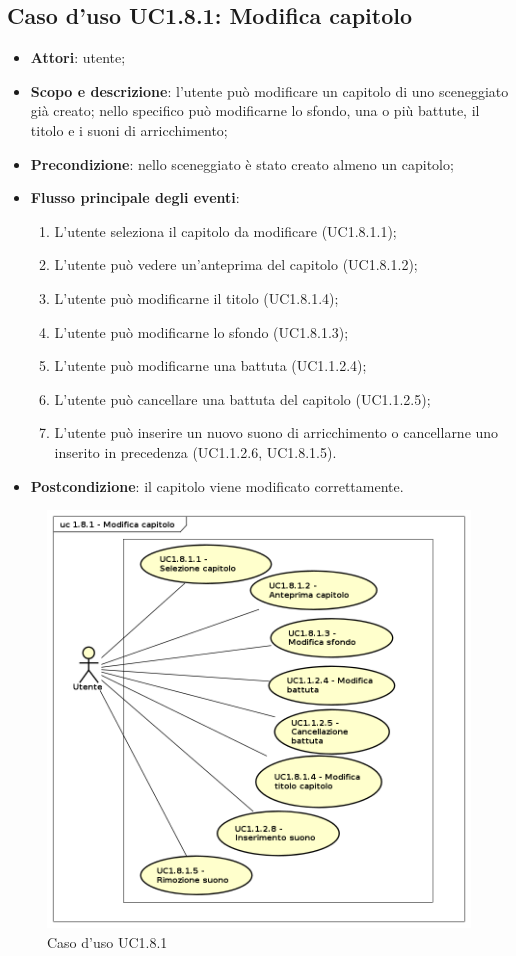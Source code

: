 \subsection{Caso d'uso UC1.8.1: Modifica capitolo}
\label{sec:UC1.8.1}

\begin{itemize}
\item \textbf{Attori}: utente;
\item \textbf{Scopo e descrizione}: l'utente può modificare un capitolo di uno sceneggiato già creato; nello specifico può modificarne lo sfondo, una o più battute, il titolo e i suoni di arricchimento;
\item \textbf{Precondizione}: nello sceneggiato è stato creato almeno un capitolo;
\item \textbf{Flusso principale degli eventi}:
\begin{enumerate}
\item L'utente seleziona il capitolo da modificare (UC1.8.1.1);
\item L'utente può vedere un'anteprima del capitolo (UC1.8.1.2);
\item L'utente può modificarne il titolo (UC1.8.1.4);
\item L'utente può modificarne lo sfondo (UC1.8.1.3);
\item L'utente può modificarne una battuta (UC1.1.2.4);
\item L'utente può cancellare una battuta del capitolo (UC1.1.2.5);
\item L'utente può inserire un nuovo suono di arricchimento o cancellarne uno inserito in precedenza (UC1.1.2.6, UC1.8.1.5).
\end{enumerate}
\item \textbf{Postcondizione}: il capitolo viene modificato correttamente.
\end{itemize}
\begin{figure}[htbp]
\centering
\includegraphics[scale=0.5]{immagini/uc1_8_1_modifica_capitolo.png}
\captionsetup{labelfont=bf}
\caption{Caso d'uso UC1.8.1}
\end{figure}
